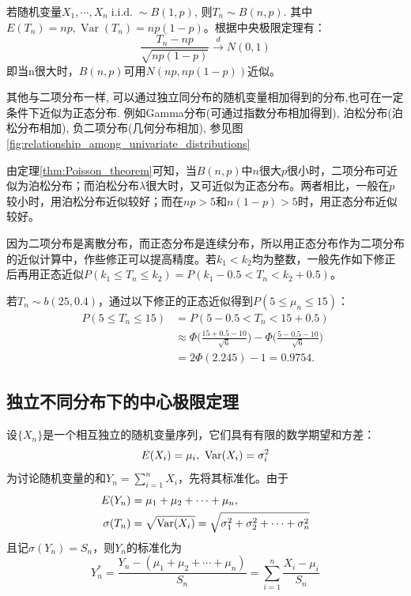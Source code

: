 \begin{corollary}
    若随机变量$X_1,\cdots ,X_n \operatorname{i.i.d.} \sim B(1,p)$, 则$T_n \sim B(n,p)$. 其中$E(T_n)=np, \operatorname{Var}(T_n)=np(1-p)$。根据中央极限定理有：
    \[ \frac{T_n - np}{\sqrt{np(1-p)}} \xrightarrow{d} N(0,1) \]
    即当n很大时，$B(n,p)$可用$N(np,np(1-p))$近似。
\end{corollary}
\begin{remark}
    其他与二项分布一样, 可以通过独立同分布的随机变量相加得到的分布,也可在一定条件下近似为正态分布. 例如Gamma分布(可通过指数分布相加得到), 泊松分布(泊松分布相加), 负二项分布(几何分布相加), 参见图\ref{fig:relationship_among_univariate_distributions}
\end{remark}
\begin{remark}
    由定理\ref{thm:Poisson_theorem}可知，当$B(n,p)$中$n$很大$p$很小时，二项分布可近似为泊松分布；而泊松分布$\lambda$很大时，又可近似为正态分布。两者相比，一般在$p$较小时，用泊松分布近似较好；而在$np>5$和$n(1-p)>5$时，用正态分布近似较好。
\end{remark}

因为二项分布是离散分布，而正态分布是连续分布，所以用正态分布作为二项分布的近似计算中，作些修正可以提高精度。若$k_1 < k_2$均为整数，一般先作如下修正后再用正态近似$P(k_1 \leq T_n \leq k_2) = P(k_1 - 0.5 < T_n < k_2 + 0.5 )$。
\begin{example}
    若$T_n \sim b (25, 0.4)$，通过以下修正的正态近似得到$P(5 \leq \mu_n \leq 15)$：
    \begin{align*}
        P(5 \le T_n \le 15) & = P(5-0.5 < T_n < 15+0.5 )                                                                             \\
                            & \approx \Phi \biggl(\frac{15+0.5-10}{\sqrt{6}} \biggr) - \Phi \biggl(\frac{5-0.5-10}{\sqrt{6}} \biggr) \\
                            & = 2 \Phi (2.245) - 1 = 0.9754.
    \end{align*}
\end{example}

\subsection{独立不同分布下的中心极限定理}

设$\{ X_n \}$是一个相互独立的随机变量序列，它们具有有限的数学期望和方差：
\[ E(X_i) = \mu_i,\ \operatorname{Var}(X_i) = \sigma_i^2 \]
为讨论随机变量的和$Y_n = \sum_{i=1}^n X_i$，先将其标准化。由于
\begin{align*}
    E(Y_n)       & = \mu_1 + \mu_2 + \dotsb + \mu_n,                                         \\
    \sigma (T_n) & = \sqrt{\operatorname{Var}(X_i)} = \sqrt{\sigma_1^2 + \sigma_2^2 + \dotsb + \sigma_n^2}
\end{align*}
且记$\sigma(Y_n) = S_n$，则$Y_n$的标准化为
\[ Y_n^* = \frac{Y_n - (\mu_1 + \mu_2 + \dotsb + \mu_n)}{S_n} = \sum_{i=1}^n \frac{X_i - \mu_i}{S_n} \]

